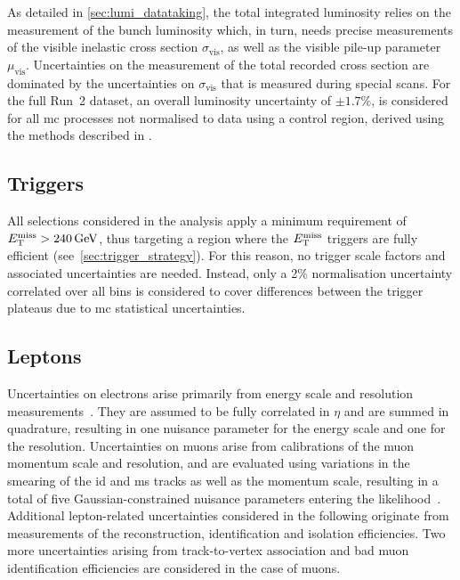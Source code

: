 As detailed in \cref{sec:lumi_datataking}, the total integrated luminosity relies on the measurement of the bunch luminosity which, in turn, needs precise measurements of the visible inelastic cross section $\sigma_\mathrm{vis}$, as well as the visible pile-up parameter $\mu_\mathrm{vis}$.
Uncertainties on the measurement of the total recorded cross section are dominated by the uncertainties on $\sigma_\mathrm{vis}$ that is measured during special  scans.
For the full Run~2 dataset, an overall luminosity uncertainty of $\pm 1.7\%$, is considered for all \gls{mc} processes not normalised to data using a control region, derived using the methods described in \cite{ATLAS-CONF-2019-021}.

\subsection{Triggers}

All selections considered in the analysis apply a minimum requirement of $\etmiss > \SI{240}{\GeV}$, thus targeting a region where the $E_{\textrm{T}}^{\textrm{miss}}$ triggers are fully efficient (see~\cref{sec:trigger_strategy}). For this reason, no trigger scale factors and associated uncertainties are needed. Instead, only a 2\% normalisation uncertainty correlated over all bins is considered to cover differences between the trigger plateaus due to \gls{mc} statistical uncertainties. 

\subsection{Leptons}

Uncertainties on electrons arise primarily from energy scale and resolution measurements~\cite{EGAM-2018-01,PERF-2017-01}.
They are assumed to be fully correlated in $\eta$ and are summed in quadrature, resulting in one nuisance parameter for the energy scale and one for the resolution.
Uncertainties on muons arise from calibrations of the muon momentum scale and resolution, and are evaluated using variations in the smearing of the \gls{id} and \gls{ms} tracks as well as the momentum scale, resulting in a total of five Gaussian-constrained nuisance parameters entering the likelihood~\cite{PERF-2015-10}.
Additional lepton-related uncertainties considered in the following originate from measurements of the reconstruction, identification and isolation efficiencies. Two more uncertainties arising from track-to-vertex association and bad muon identification efficiencies are considered in the case of muons.

